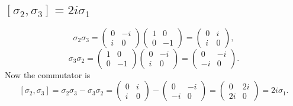 \documentclass[10pt]{article}
\begin{document}
\subsection{$[\sigma_2, \sigma_3] = 2i\sigma_1$}
\[
\sigma_2 \sigma_3 = \begin{pmatrix}
0 &  -i \\
i & 0
\end{pmatrix} 
\begin{pmatrix}
1 & 0 \\
0 & -1
\end{pmatrix} =
\begin{pmatrix}
0 & i \\
i & 0
\end{pmatrix},
\]
%
\[
\sigma_3 \sigma_2 = 
\begin{pmatrix}
1 & 0 \\
0 & -1
\end{pmatrix} 
\begin{pmatrix}
0 &  -i \\
i & 0
\end{pmatrix} 
=
\begin{pmatrix}
0 & -i \\
-i & 0 
\end{pmatrix}.
\]
Now the commutator is 
\[
[\sigma_2, \sigma_3] = \sigma_2\sigma_3 - \sigma_3\sigma_2 =
\begin{pmatrix}
0 & i \\
i & 0
\end{pmatrix}
-
\begin{pmatrix}
0 & -i \\
-i & 0
\end{pmatrix}
=
\begin{pmatrix}
0 & 2i \\
2i & 0
\end{pmatrix} = 2i\sigma_1.
\]
\end{document}
